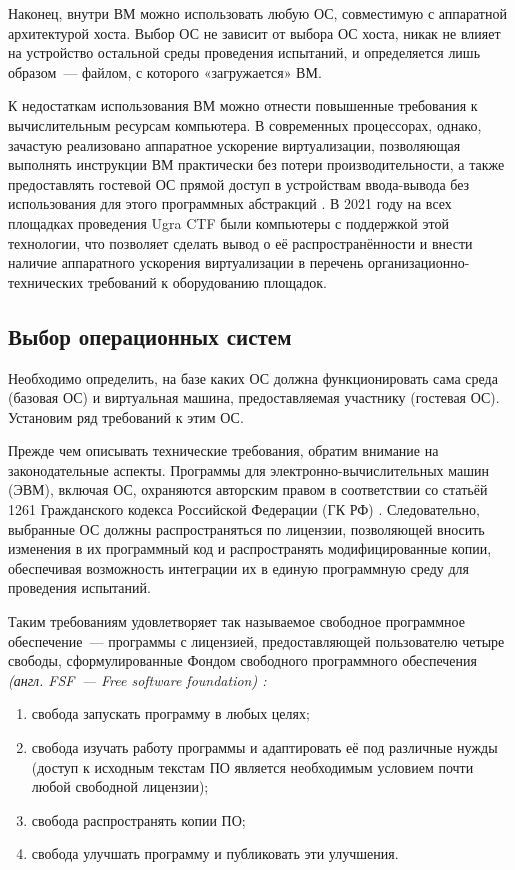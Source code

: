 Наконец, внутри ВМ можно использовать любую ОС, совместимую с аппаратной архитектурой хоста. Выбор ОС не зависит от выбора ОС хоста, никак не влияет на устройство остальной среды проведения испытаний, и определяется лишь образом~--- файлом, с которого «загружается» ВМ.

К недостаткам использования ВМ можно отнести повышенные требования к вычислительным ресурсам компьютера. В современных процессорах, однако, зачастую реализовано аппаратное ускорение виртуализации, позволяющая выполнять инструкции ВМ практически без потери производительности, а также предоставлять гостевой ОС прямой доступ в устройствам ввода-вывода без использования для этого программных абстракций \cite{VMWarex86}. В 2021 году на всех площадках проведения Ugra CTF были компьютеры с поддержкой этой технологии, что позволяет сделать вывод о её распространённости и внести наличие аппаратного ускорения виртуализации в перечень организационно-технических требований к оборудованию площадок.



\subsection{Выбор операционных систем}

Необходимо определить, на базе каких ОС должна функционировать сама среда (базовая ОС) и виртуальная машина, предоставляемая участнику (гостевая ОС). Установим ряд требований к этим ОС.

Прежде чем описывать технические требования, обратим внимание на законодательные аспекты. Программы для электронно-вычислительных машин (ЭВМ), включая ОС, охраняются авторским правом в соответствии со статьёй 1261 Гражданского кодекса Российской Федерации (ГК РФ) \cite{GK1261}. Следовательно, выбранные ОС должны распространяться по лицензии, позволяющей вносить изменения в их программный код и распространять модифицированные копии, обеспечивая возможность интеграции их в единую программную среду для проведения испытаний.


Таким требованиям удовлетворяет так называемое свободное программное обеспечение~--- программы с лицензией, предоставляющей пользователю четыре свободы, сформулированные Фондом свободного программного обеспечения \textit{(англ. FSF~--- Free software foundation) \cite{GNUfree}:}
\begin{enumerate}
\item свобода запускать программу в любых целях;
\item свобода изучать работу программы и адаптировать её под различные нужды (доступ к исходным текстам ПО является необходимым условием почти любой свободной лицензии);
\item свобода распространять копии ПО;
\item свобода улучшать программу и публиковать эти улучшения.
\end{enumerate}



